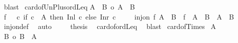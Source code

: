 \begin{isabellebody}
\ blast%
\endisatagproof
{\isafoldproof}%
%
\isadelimproof
\isanewline
%
\endisadelimproof
\isanewline
{}\isamarkupfalse%
\ card{\isacharunderscore}{\kern0pt}of{\isacharunderscore}{\kern0pt}Un{\isacharunderscore}{\kern0pt}Plus{\isacharunderscore}{\kern0pt}ordLeq{\isacharcolon}{\kern0pt}\isanewline
{\isachardoublequoteopen}{\isacharbar}{\kern0pt}A\ {\isasymunion}\ B{\isacharbar}{\kern0pt}\ {\isasymle}o\ {\isacharbar}{\kern0pt}A\ {\isacharless}{\kern0pt}{\isacharplus}{\kern0pt}{\isachargreater}{\kern0pt}\ B{\isacharbar}{\kern0pt}{\isachardoublequoteclose}\isanewline
%
\isadelimproof
%
\endisadelimproof
%
\isatagproof
{}\isamarkupfalse%
{\isacharminus}{\kern0pt}\isanewline
\ \ \ \isamarkupfalse%
\ {\isacharquery}{\kern0pt}f\ {\isacharequal}{\kern0pt}\ {\isachardoublequoteopen}{\isasymlambda}\ c{\isachardot}{\kern0pt}\ if\ c\ {\isasymin}\ A\ then\ Inl\ c\ else\ Inr\ c{\isachardoublequoteclose}\isanewline
\ \ \ \isamarkupfalse%
\ {\isachardoublequoteopen}inj{\isacharunderscore}{\kern0pt}on\ {\isacharquery}{\kern0pt}f\ {\isacharparenleft}{\kern0pt}A\ {\isasymunion}\ B{\isacharparenright}{\kern0pt}\ {\isasymand}\ {\isacharquery}{\kern0pt}f\ {\isacharbackquote}{\kern0pt}\ {\isacharparenleft}{\kern0pt}A\ {\isasymunion}\ B{\isacharparenright}{\kern0pt}\ {\isasymle}\ A\ {\isacharless}{\kern0pt}{\isacharplus}{\kern0pt}{\isachargreater}{\kern0pt}\ B{\isachardoublequoteclose}\isanewline
\ \ \ \isamarkupfalse%
\ inj{\isacharunderscore}{\kern0pt}on{\isacharunderscore}{\kern0pt}def\ \isamarkupfalse%
\ auto\isanewline
\ \ \ \isamarkupfalse%
\ {\isacharquery}{\kern0pt}thesis\ \isamarkupfalse%
\ card{\isacharunderscore}{\kern0pt}of{\isacharunderscore}{\kern0pt}ordLeq\ \isamarkupfalse%
\ blast\isanewline
{}\isamarkupfalse%
%
\endisatagproof
{\isafoldproof}%
%
\isadelimproof
\isanewline
%
\endisadelimproof
\isanewline
{}\isamarkupfalse%
\ card{\isacharunderscore}{\kern0pt}of{\isacharunderscore}{\kern0pt}Times{}{\isacharcolon}{\kern0pt}\isanewline
{}\ {\isachardoublequoteopen}A\ {\isasymnoteq}\ {\isacharbraceleft}{\kern0pt}{\isacharbraceright}{\kern0pt}{\isachardoublequoteclose}\isanewline
{}\ {\isachardoublequoteopen}{\isacharbar}{\kern0pt}B{\isacharbar}{\kern0pt}\ {\isasymle}o\ {\isacharbar}{\kern0pt}B\ {\isasymtimes}\ A{\isacharbar}{\kern0pt}{\isachardoublequoteclose}\isanewline
%
\isadelimproof
%
\endisadelimproof
%
\isatagproof
{}\isamarkupfalse%

\end{isabellebody}

